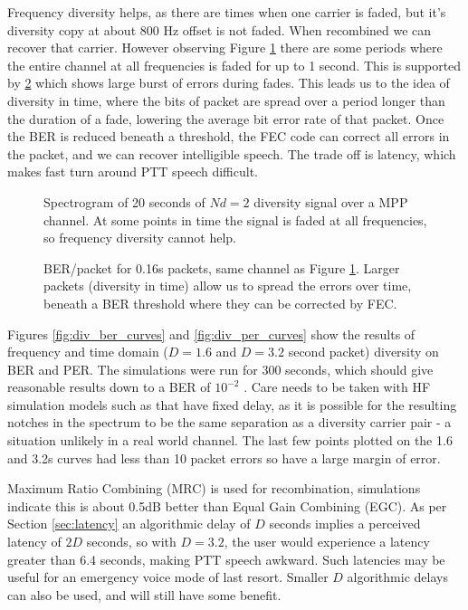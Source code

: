 \documentclass{article}
\begin{document}
Frequency diversity helps, as there are times when one carrier is faded, but it's diversity copy at about 800 Hz offset is not faded.  When recombined we can recover that carrier.  However observing Figure \ref{fig:spectrogram} there are some periods where the entire channel at all frequencies is faded for up to 1 second. This is supported by \ref{fig:ber_packet} which shows large burst of errors during fades. This leads us to the idea of diversity in time, where the bits of packet are spread over a period longer than the duration of a fade, lowering the average bit error rate of that packet. Once the BER is reduced beneath a threshold, the FEC code can correct all errors in the packet, and we can recover intelligible speech. The trade off is latency, which makes fast turn around PTT speech difficult.

\begin{figure}[H]
\caption{Spectrogram of 20 seconds of $Nd=2$ diversity signal over a MPP channel. At some points in time the signal is faded at all frequencies, so frequency diversity cannot help.}
\label{fig:spectrogram}
\begin{center}

\end{center}
\end{figure}

\begin{figure}[H]
\caption{BER/packet for 0.16s packets, same channel as Figure \ref{fig:spectrogram}.  Larger packets (diversity in time) allow us to spread the errors over time, beneath a BER threshold where they can be corrected by FEC.}
\label{fig:ber_packet}
\begin{center}

\end{center}
\end{figure}

Figures \ref{fig:div_ber_curves} and \ref{fig:div_per_curves} show the results of frequency and time domain ($D=1.6$ and $D=3.2$ second packet) diversity on BER and PER.  The simulations were run for 300 seconds, which should give reasonable results down to a BER of $10^{-2}$ \cite{itu1487}. Care needs to be taken with HF simulation models such as \cite{itu1487} that have fixed delay, as it is possible for the resulting notches in the spectrum to be the same separation as a diversity carrier pair - a situation unlikely in a real world channel.  The last few points plotted on the 1.6 and 3.2s curves had less than 10 packet errors so have a large margin of error.

Maximum Ratio Combining (MRC) is used for recombination, simulations indicate this is about 0.5dB better than Equal Gain Combining (EGC). As per Section \ref{sec:latency} an algorithmic delay of $D$ seconds implies a perceived latency of $2D$ seconds, so with $D=3.2$, the user would experience a latency greater than 6.4 seconds, making PTT speech awkward.  Such latencies may be useful for an emergency voice mode of last resort. Smaller $D$ algorithmic delays can also be used, and will still have some benefit.
\end{document}
